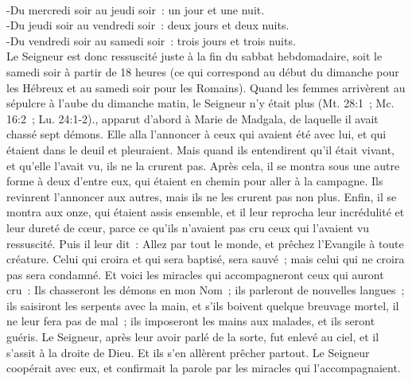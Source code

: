 \begin{multicols}{2}
{\\-Du mercredi soir au jeudi soir~: un jour et une nuit.
\\-Du jeudi soir au vendredi soir~: deux jours et deux nuits.
\\-Du vendredi soir au samedi soir~: trois jours et trois nuits. 
\\Le Seigneur est donc ressuscité juste à la fin du sabbat hebdomadaire, soit le samedi soir à partir de 18 heures (ce qui correspond au début du dimanche pour les Hébreux et au samedi soir pour les Romains). Quand les femmes arrivèrent au sépulcre à l'aube du dimanche matin, le Seigneur n'y était plus (Mt. 28:1~; Mc. 16:2~; Lu. 24:1-2).}, apparut d'abord à Marie de Madgala, de laquelle il avait chassé sept démons.
Elle alla l'annoncer à ceux qui avaient été avec lui, et qui étaient dans le deuil et pleuraient.
Mais quand ils entendirent qu'il était vivant, et qu'elle l'avait vu, ils ne la crurent pas.
Après cela, il se montra sous une autre forme à deux d'entre eux, qui étaient en chemin pour aller à la campagne.
Ils revinrent l'annoncer aux autres, mais ils ne les crurent pas non plus.
Enfin, il se montra aux onze, qui étaient assis ensemble, et il leur reprocha leur incrédulité et leur dureté de cœur, parce ce qu'ils n'avaient pas cru ceux qui l'avaient vu ressuscité.
Puis il leur dit~: Allez par tout le monde, et prêchez l'Evangile à toute créature.
Celui qui croira et qui sera baptisé, sera sauvé~; mais celui qui ne croira pas sera condamné.
Et voici les miracles qui accompagneront ceux qui auront cru~: Ils chasseront les démons en mon Nom~; ils parleront de nouvelles langues~;
ils saisiront les serpents avec la main, et s'ils boivent quelque breuvage mortel, il ne leur fera pas de mal~; ils imposeront les mains aux malades, et ils seront guéris.
Le Seigneur, après leur avoir parlé de la sorte, fut enlevé au ciel, et il s'assit à la droite de Dieu.
Et ils s'en allèrent prêcher partout. Le Seigneur coopérait avec eux, et confirmait la parole par les miracles qui l'accompagnaient.
\PPE{}
\end{multicols}
